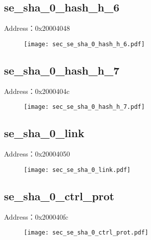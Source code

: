\subsection{se\_sha\_0\_hash\_h\_6}
\label{sec-se-sha-0-hash-h-6}
Address：0x20004048
 \begin{figure}[H]
\texttt{[image: sec\_se\_sha\_0\_hash\_h\_6.pdf]}
\end{figure}

\subsection{se\_sha\_0\_hash\_h\_7}
\label{sec-se-sha-0-hash-h-7}
Address：0x2000404c
 \begin{figure}[H]
\texttt{[image: sec\_se\_sha\_0\_hash\_h\_7.pdf]}
\end{figure}

\subsection{se\_sha\_0\_link}
\label{sec-se-sha-0-link}
Address：0x20004050
 \begin{figure}[H]
\texttt{[image: sec\_se\_sha\_0\_link.pdf]}
\end{figure}

\subsection{se\_sha\_0\_ctrl\_prot}
\label{sec-se-sha-0-ctrl-prot}
Address：0x200040fc
 \begin{figure}[H]
\texttt{[image: sec\_se\_sha\_0\_ctrl\_prot.pdf]}
\end{figure}

